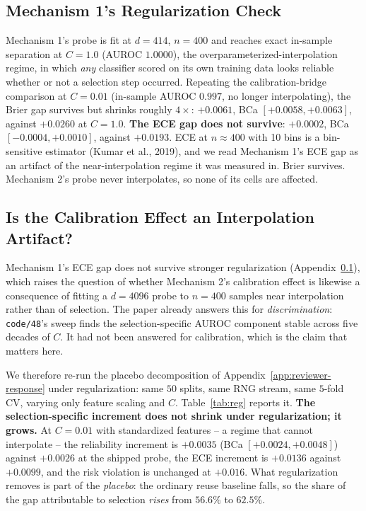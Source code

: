 \documentclass{article}
\begin{document}
\subsection{Mechanism 1's Regularization Check}
\label{app:reg}
Mechanism 1's probe is fit at $d=414$, $n=400$ and reaches exact in-sample
separation at $C=1.0$ (AUROC $1.0000$), the overparameterized-interpolation
regime, in which \emph{any} classifier scored on its own training data looks
reliable whether or not a selection step occurred. Repeating the
calibration-bridge comparison at $C=0.01$ (in-sample AUROC $0.997$, no longer
interpolating), the Brier gap survives but shrinks roughly $4\times$:
$+0.0061$, BCa $[+0.0058,+0.0063]$, against $+0.0260$ at $C=1.0$. \textbf{The
ECE gap does not survive}: $+0.0002$, BCa $[-0.0004,+0.0010]$, against
$+0.0193$. ECE at $n\approx400$ with 10 bins is a bin-sensitive estimator
(Kumar et al., 2019), and we read Mechanism 1's ECE gap as an artifact of the
near-interpolation regime it was measured in. Brier survives. Mechanism 2's
probe never interpolates, so none of its cells are affected.

\subsection{Is the Calibration Effect an Interpolation Artifact?}
\label{app:regularization}

Mechanism 1's ECE gap does not survive stronger regularization
(Appendix~\ref{app:reg}), which raises the question of whether Mechanism 2's
calibration effect is likewise a consequence of fitting a $d{=}4096$ probe to
$n{=}400$ samples near interpolation rather than of selection. The paper
already answers this for \emph{discrimination}: \texttt{code/48}'s sweep finds
the selection-specific AUROC component stable across five decades of $C$. It
had not been answered for calibration, which is the claim that matters here.

We therefore re-run the placebo decomposition of
Appendix~\ref{app:reviewer-response} under regularization: same $50$ splits,
same RNG stream, same $5$-fold CV, varying only feature scaling and $C$.
Table~\ref{tab:reg} reports it. \textbf{The selection-specific increment does
not shrink under regularization; it grows.} At $C{=}0.01$ with standardized
features -- a regime that cannot interpolate -- the reliability increment is
$+0.0035$ (BCa $[+0.0024,+0.0048]$) against $+0.0026$ at the shipped probe, the
ECE increment is $+0.0136$ against $+0.0099$, and the risk violation is
unchanged at $+0.016$. What regularization removes is part of the
\emph{placebo}: the ordinary reuse baseline falls, so the share of the gap
attributable to selection \emph{rises} from $56.6\%$ to $62.5\%$.
\end{document}
